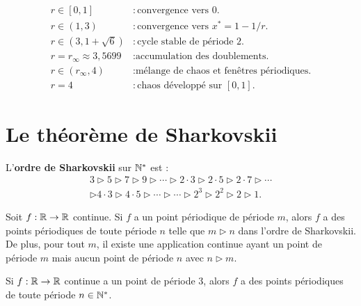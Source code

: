\begin{formules}[title=\textbf{R\'egimes de l'application logistique}]
\begin{align*}
    r \in [0, 1] &: \text{convergence vers } 0. \\
    r \in (1, 3) &: \text{convergence vers } x^* = 1 - 1/r. \\
    r \in (3, 1+\sqrt{6}) &: \text{cycle stable de p\'eriode } 2. \\
    r = r_\infty \approx 3{,}5699 &: \text{accumulation des doublements.} \\
    r \in (r_\infty, 4) &: \text{m\'elange de chaos et fen\^etres p\'eriodiques.} \\
    r = 4 &: \text{chaos d\'evelopp\'e sur } [0, 1].
\end{align*}
\end{formules}

\section{Le th\'eor\`eme de Sharkovskii}

\begin{definition}
L'\textbf{ordre de Sharkovskii} sur $\mathbb{N}^*$ est :
\begin{multline*}
    3 \triangleright 5 \triangleright 7 \triangleright 9 \triangleright \cdots
    \triangleright 2 \cdot 3 \triangleright 2 \cdot 5 \triangleright 2 \cdot 7
    \triangleright \cdots \\
    \triangleright 4 \cdot 3 \triangleright 4 \cdot 5 \triangleright \cdots
    \triangleright \cdots \triangleright 2^3 \triangleright 2^2
    \triangleright 2 \triangleright 1.
\end{multline*}
\end{definition}

\begin{theoreme}[Sharkovskii, 1964]
Soit $f : \mathbb{R} \to \mathbb{R}$ continue. Si $f$ a un point p\'eriodique de p\'eriode $m$,
alors $f$ a des points p\'eriodiques de toute p\'eriode $n$ telle que
$m \triangleright n$ dans l'ordre de Sharkovskii. De plus, pour tout $m$,
il existe une application continue ayant un point de p\'eriode $m$ mais aucun
point de p\'eriode $n$ avec $n \triangleright m$.
\end{theoreme}

\begin{corollaire}
Si $f : \mathbb{R} \to \mathbb{R}$ continue a un point de p\'eriode 3, alors $f$ a des points
p\'eriodiques de toute p\'eriode $n \in \mathbb{N}^*$.
\end{corollaire}

